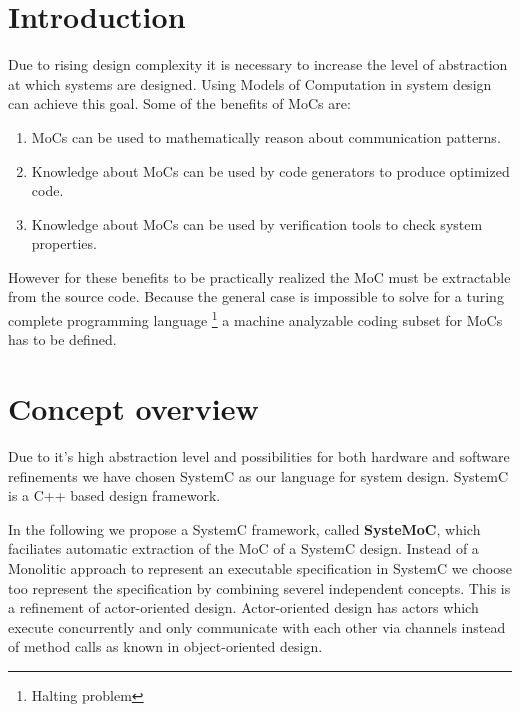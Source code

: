\newcommand{\graphicPostfix}{pdf}
\newcommand{\resdir}{../../../HscdTeXRes/}
\newcommand{\code}[1]{{\bf #1}}
\newcommand{\SysteMoC}{{\bf SysteMoC}}
\newcommand{\SysteMoCV}{\SysteMoC{} {\bf 1.0}}



\usepackage{multirow}


\clearpage
\tableofcontents
\clearpage

\section{Introduction\label{intro}}
Due to rising design complexity it is necessary to increase
the level of abstraction at which systems are designed. Using
Models of Computation in system design can achieve this goal.
Some of the benefits of MoCs are:
\begin{enumerate}
\item MoCs can be used to mathematically reason about communication
patterns.

\item Knowledge about MoCs can be used by code generators to produce
optimized code.

\item Knowledge about MoCs can be used by verification tools to
check system properties.
\end{enumerate}
However for these benefits to be practically realized the
MoC must be extractable from the source code. Because the general case
is impossible to solve for a turing complete programming language
\footnote{Halting problem} a machine analyzable coding subset for
MoCs has to be defined.

\section{Concept overview}

Due to it's high abstraction level and possibilities for both
hardware and software refinements we have chosen SystemC
\cite{systemc-lrm:2003} \cite{glms:2002} as our language for system design.
SystemC is a C++ based design framework.

In the following we propose a SystemC framework, called \SysteMoC, which
faciliates automatic extraction of the MoC of a SystemC design.
Instead of a Monolitic approach to represent an executable specification
in SystemC we choose too represent the specification
by combining severel independent concepts. This is a refinement of
actor-oriented design. Actor-oriented design has actors which execute
concurrently and only communicate with each other via channels instead
of method calls as known in object-oriented design.

